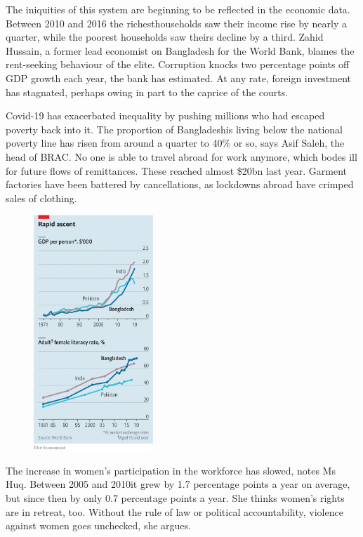 \documentclass{article}
\begin{document}
The iniquities of this system are beginning to be reflected in the economic data. Between 2010 and 2016 the richest\textbf{}households saw their income rise by nearly a quarter, while the poorest households saw theirs decline by a third. Zahid Hussain, a former lead economist on Bangladesh for the World Bank, blames the rent-seeking behaviour of the elite. Corruption knocks two percentage points off GDP growth each year, the bank has estimated. At any rate, foreign investment has stagnated, perhaps owing in part to the caprice of the courts. 

Covid-19 has exacerbated inequality by pushing millions who had escaped poverty back into it. The proportion of Bangladeshis living below the national poverty line has risen from around a quarter to 40\% or so, says Asif Saleh, the head of BRAC. No one is able to travel abroad for work anymore, which bodes ill for future flows of remittances. These reached almost \$20bn last year. Garment factories have been battered by cancellations, as lockdowns abroad have crimped sales of clothing. 

\begin{figure}[h]
\centering
\includegraphics[width=0.4\textwidth]{images/20210327_ASC297_0.png}
\end{figure}


The increase in women's participation in the workforce has slowed, notes Ms Huq. Between 2005 and 2010\textbf{}it grew by 1.7 percentage points a year on average, but since then by only 0.7 percentage points a year. She thinks women's rights are in retreat, too. Without the rule of law or political accountability, violence against women goes unchecked, she argues. 
\end{document}
